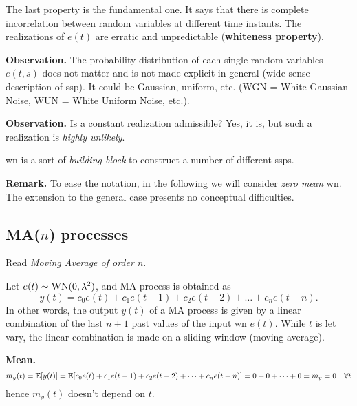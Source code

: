 The last property is the fundamental one. It says that there is complete incorrelation between random variables at different time instants. The realizations of $e(t)$ are erratic and unpredictable (\textbf{whiteness property}).

\begin{figure}[htpb]
	\centering
\end{figure}
\FloatBarrier

\textbf{Observation.} The probability distribution of each single random variables $e(t,s)$ does not matter and is not made explicit in general (wide-sense description of \gls{ssp}).
It could be Gaussian, uniform, etc. (WGN = White Gaussian Noise, WUN = White Uniform Noise, etc.).

\textbf{Observation.} Is a constant realization admissible? Yes, it is, but such a realization is \emph{highly unlikely}.

\gls{wn} is a sort of \emph{building block} to construct a number of different \glspl{ssp}.

\textbf{Remark.} To ease the notation, in the following we will consider \emph{zero mean} \gls{wn}. The extension to the general case presents no conceptual difficulties.

\subsection{MA(\texorpdfstring{$n$}{n}) processes}

Read \emph{Moving Average of order $n$}.

Let $e(t) \sim \operatorname{WN}(0, \lambda^{2})$, and MA process is obtained as
\[
	\boxed{y(t)=c_{0} e(t)+c_{1} e(t-1)+c_{2} e(t-2)+\ldots+c_{n} e(t-n).}
\]
In other words, the output $y(t)$ of a MA process is given by a linear combination of the last $n+1$ past values of the input \gls{wn} $e(t)$.
While $t$ is let vary, the linear combination is made on a sliding window (moving average).

\textbf{Mean.}
\[
	m_{y}(t)=\mathbb{E}[y(t)] = \mathbb{E}[c_{0} e(t)+c_{1} e(t-1)+c_{2} e(t-2)+\cdots+c_{n} e(t-n)] = 0+0+\cdots+0=m_{y}=0 \quad \forall t
\]
hence $m_{y}(t)$ doesn't depend on $t$.


